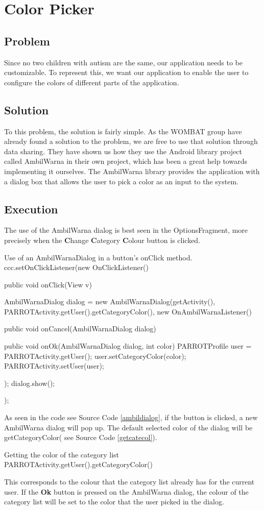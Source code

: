 \section{Color Picker}%
\label{colpic}
\subsection*{Problem}
Since no two children with autism are the same, our application needs to be customizable. To represent this, we want our application to enable the user to configure the colors of different parts of the application.

\subsection*{Solution}
To this problem, the solution is fairly simple. As the WOMBAT group have already found a solution to the problem, we are free to use that solution through data sharing. %
They have shown us how they use the Android library project called AmbilWarna in their own project, which has been a great help towards implementing it ourselves. The AmbilWarna library provides the application with a dialog box that allows the user to pick a color as an input to the system.

\subsection*{Execution}{}
The use of the AmbilWarna dialog is best seen in the OptionsFragment, more precisely when the \textbf{C}hange \textbf{C}ategory \textbf{C}olour button is clicked.

\begin{source}[{ambildialog}]{Use of an AmbilWarnaDialog in a button's onClick method.}
		ccc.setOnClickListener(new OnClickListener() {
			public void onClick(View v) {
				AmbilWarnaDialog dialog = new AmbilWarnaDialog(getActivity(),
						PARROTActivity.getUser().getCategoryColor(), new OnAmbilWarnaListener() {
					public void onCancel(AmbilWarnaDialog dialog) {
					}

					public void onOk(AmbilWarnaDialog dialog, int color) {
						PARROTProfile user = PARROTActivity.getUser();
						user.setCategoryColor(color);
						PARROTActivity.setUser(user);
					}
				});
				dialog.show();
			}
		});
\end{source}

As seen in the code see Source Code \ref{ambildialog}, if the button is clicked, a new AmbilWarna dialog will pop up. The default selected color of the dialog will be getCategoryColor( see Source Code \ref{getcatecol}). 
\begin{source}[{getcatecol}]{Getting the color of the category list}
PARROTActivity.getUser().getCategoryColor()
\end{source}
This corresponds to the colour that the category list already has for the current user.\newline
If the \textbf{Ok} button is pressed on the AmbilWarna dialog, the colour of the category list will be set to the color that the user picked in the dialog.


